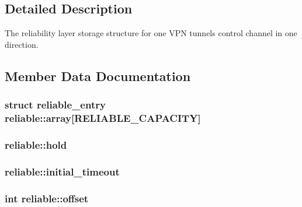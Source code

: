 \subsection{Detailed Description}
The reliability layer storage structure for one V\+P\+N tunnel\textquotesingle{}s control channel in one direction. 

\subsection{Member Data Documentation}
\hypertarget{structreliable_a1e75059a686e2625f46ca7764e90052e}{}
\subsubsection[{array}]{\setlength{\rightskip}{0pt plus 5cm}struct {\bf reliable\+\_\+entry} reliable\+::array\mbox{[}{\bf R\+E\+L\+I\+A\+B\+L\+E\+\_\+\+C\+A\+P\+A\+C\+I\+T\+Y}\mbox{]}}\label{structreliable_a1e75059a686e2625f46ca7764e90052e}
\hypertarget{structreliable_a2be86afe4085c4dd783192abeacf0203}{}
\subsubsection[{hold}]{ reliable\+::hold}\label{structreliable_a2be86afe4085c4dd783192abeacf0203}
\hypertarget{structreliable_a7e6d00ae7a9b6f3350ea40878c66e69f}{}
\subsubsection[{initial\+\_\+timeout}]{ reliable\+::initial\+\_\+timeout}\label{structreliable_a7e6d00ae7a9b6f3350ea40878c66e69f}
\hypertarget{structreliable_af881f7757244b075580879431304cf8a}{}
\subsubsection[{offset}]{\setlength{\rightskip}{0pt plus 5cm}int reliable\+::offset}\label{structreliable_af881f7757244b075580879431304cf8a}
\hypertarget{structreliable_a565cf23e829f768c537aaf4a99d5d72f}{}

